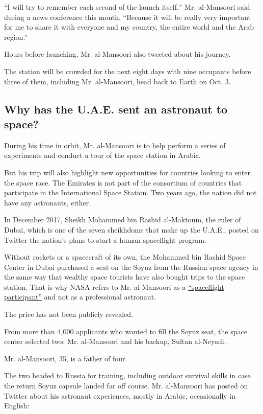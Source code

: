 ``I will try to remember each second of the launch itself,'' Mr.
al-Mansoori said during a news conference this month. ``Because it will
be really very important for me to share it with everyone and my
country, the entire world and the Arab region.''

Hours before launching, Mr. al-Mansoori also tweeted about his journey.

The station will be crowded for the next eight days with nine occupants
before three of them, including Mr. al-Mansoori, head back to Earth on
Oct. 3.

\hypertarget{why-has-the-uae-sent-an-astronaut-to-space}{%
\subsection{Why has the U.A.E. sent an astronaut to
space?}\label{why-has-the-uae-sent-an-astronaut-to-space}}

During his time in orbit, Mr. al-Mansoori is to help perform a series of
experiments and conduct a tour of the space station in Arabic.

But his trip will also highlight new opportunities for countries looking
to enter the space race. The Emirates is not part of the consortium of
countries that participate in the International Space Station. Two years
ago, the nation did not have any astronauts, either.

In December 2017, Sheikh Mohammed bin Rashid al-Maktoum, the ruler of
Dubai, which is one of the seven sheikhdoms that make up the U.A.E.,
posted on Twitter the nation's plans to start a human spaceflight
program.

Without rockets or a spacecraft of its own, the Mohammed bin Rashid
Space Center in Dubai purchased a seat on the Soyuz from the Russian
space agency in the same way that wealthy space tourists have also
bought trips to the space station. That is why NASA refers to Mr.
al-Mansoori as a
\href{https://www.nasa.gov/image-feature/spaceflight-participant-hazzaa-ali-almansoori}{``spaceflight
participant''} and not as a professional astronaut.

The price has not been publicly revealed.

From more than 4,000 applicants who wanted to fill the Soyuz seat, the
space center selected two: Mr. al-Mansoori and his backup, Sultan
al-Neyadi.

Mr. al-Mansoori, 35, is a father of four.

The two headed to Russia for training, including outdoor survival skills
in case the return Soyuz capsule landed far off course. Mr. al-Mansoori
has posted on Twitter about his astronaut experiences, mostly in Arabic,
occasionally in English:

